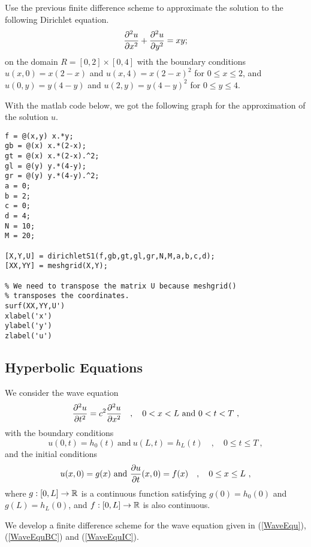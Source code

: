 \begin{egg}
Use the previous finite difference scheme to approximate the solution to
the following Dirichlet equation.
\[
\frac{\partial^{2}{u}}{\partial{x}^{2}} + \frac{\partial^{2}{u}}{\partial{y}^{2}} = xy;
\]
on the domain $R=[0,2] \times [0,4]$ with the boundary conditions
$u(x,0) = x(2-x)$ and $u(x,4) = x(2-x)^2$ for $0 \leq x \leq 2$, and
$u(0,y) = y(4-y)$ and $u(2,y) = y(4-y)^2$ for $0 \leq y \leq 4$.

With the matlab code below, we got the following graph for the
approximation of the solution $u$.

\begin{code}
\small
\begin{verbatim}
f = @(x,y) x.*y;
gb = @(x) x.*(2-x);
gt = @(x) x.*(2-x).^2;
gl = @(y) y.*(4-y);
gr = @(y) y.*(4-y).^2;
a = 0;
b = 2;
c = 0;
d = 4;
N = 10;
M = 20;

[X,Y,U] = dirichletS1(f,gb,gt,gl,gr,N,M,a,b,c,d);
[XX,YY] = meshgrid(X,Y);

% We need to transpose the matrix U because meshgrid()
% transposes the coordinates.
surf(XX,YY,U')
xlabel('x')
ylabel('y')
zlabel('u')
\end{verbatim}
\end{code}
\end{egg}

\subsection{Hyperbolic Equations} \label{DerWaveSection}

We consider the wave equation
\begin{equation}\label{WaveEqu}
  \frac{\partial^{2}{u}}{\partial{t}^{2}} = c^2 \frac{\partial^{2}{u}}{\partial{x}^{2}} \quad , \quad
  0 < x < L \ \text{and} \ 0<t<T \ ,
\end{equation}
with the boundary conditions
\begin{equation}\label{WaveEquBC}
u(0,t)=h_0(t) \ \text{and} \ u(L,t)=h_L(t) \quad , \quad 0\leq t \leq T \ ,
\end{equation}
and the initial conditions
\begin{equation} \label{WaveEquIC}
u(x,0) = g(x) \ \text{and} \ \frac{\partial{u}}{\partial{t}}(x,0) = f(x) \quad , \quad
 0 \leq x \leq L \ ,
\end{equation}
where $g:[0,L]\rightarrow \mathbb{R}$ is a continuous function satisfying
$g(0)=h_0(0)$ and $g(L)=h_L(0)$, and $f:[0,L]\rightarrow \mathbb{R}$ is also
continuous.

We develop a finite difference scheme for the wave equation given
in (\ref{WaveEqu}), (\ref{WaveEquBC}) and (\ref{WaveEquIC}).


